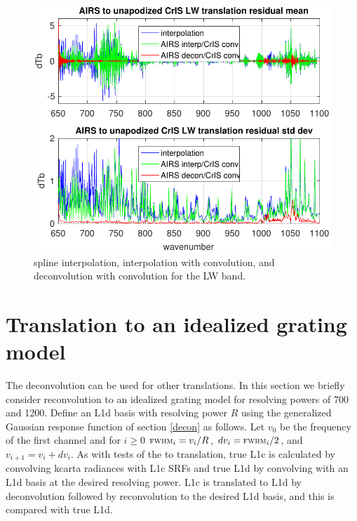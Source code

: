 \documentclass[10pt,twocolumn]{article}  %
\begin{document}
\begin{figure} %
  \centering
  \includegraphics[width=\linewidth]{figures/a2cris_interp_LW.pdf}
  \caption{spline interpolation, interpolation with convolution, 
    and deconvolution with convolution for the {\cris} LW band.}
  \label{intpLW}
\end{figure}

\FloatBarrier
\section{Translation to an idealized grating model}
\label{airsL1d}


The {\airs} deconvolution can be used for other translations.  
In this section we briefly consider reconvolution to an idealized
grating model for resolving powers of 700 and 1200.  Define an
{\airs} L1d basis with resolving power $R$ using the generalized
Gaussian response function of section \ref{decon} as follows.
Let $v_0$ be the frequency of the first channel and for $i\ge0$
$\mbox{\small\textsc{fwhm}}_i = v_i / R$, $dv_i = \mbox{\small\textsc{fwhm}}_i / 2$, and $v_{i+1} = v_i +
dv_i$.  As with tests of the {\airs} to {\cris} translation, true
L1c is calculated by convolving kcarta radiances with {\airs} L1c
SRFs and true L1d by convolving with an L1d basis at the desired
resolving power.  L1c is translated to L1d by deconvolution followed
by reconvolution to the desired L1d basis, and this is compared with
true L1d.
\end{document}

